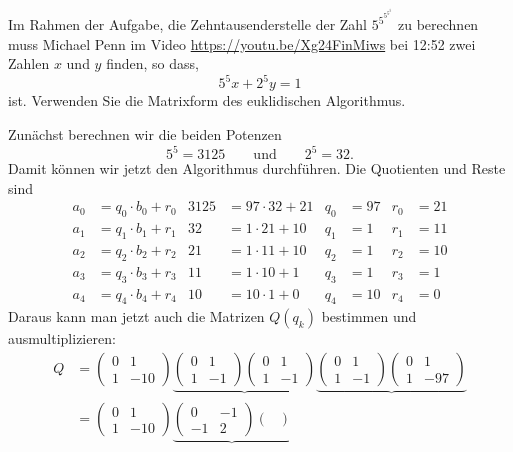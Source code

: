 Im Rahmen der Aufgabe, die Zehntausenderstelle der Zahl $5^{5^{5^{5^5}}}$
zu berechnen muss Michael Penn im Video 
\url{https://youtu.be/Xg24FinMiws} bei 12:52 zwei Zahlen $x$ und $y$ finden,
so dass,
\[
5^5x
+
2^5y
=
1
\]
ist.
Verwenden Sie die Matrixform des euklidischen Algorithmus.

\begin{loesung}
Zunächst berechnen wir die beiden Potenzen
\[
5^5 = 3125
\qquad\text{und}\qquad
2^5 = 32.
\]
Damit können wir jetzt den Algorithmus durchführen.
Die Quotienten und Reste sind
\begin{align*}
a_0&=q_0\cdot b_0 + r_0&
3125 &= 97 \cdot 32 + 21& q_0&=97 & r_0&= 21\\
a_1&=q_1\cdot b_1 + r_1&
32 &= 1\cdot 21 + 10    & q_1&= 1 & r_1&= 11\\
a_2&=q_2\cdot b_2 + r_2&
21 &= 1\cdot 11 + 10    & q_2&= 1 & r_2&= 10\\
a_3&=q_3\cdot b_3 + r_3&
11 &= 1\cdot 10 +  1    & q_3&= 1 & r_3&=  1\\
a_4&=q_4\cdot b_4 + r_4&
10 &= 10\cdot 1 +  0    & q_4&=10 & r_4&=  0
\end{align*}
Daraus kann man jetzt auch die Matrizen $Q(q_k)$ bestimmen und
ausmultiplizieren:
\begin{align*}
Q
&=
\begin{pmatrix}
0&1\\1&-10
\end{pmatrix}
\underbrace{
\begin{pmatrix}
0&1\\1&-1
\end{pmatrix}
\begin{pmatrix}
0&1\\1&-1
\end{pmatrix}
}_{}
\underbrace{
\begin{pmatrix}
0&1\\1&-1
\end{pmatrix}
\begin{pmatrix}
0&1\\1&-97
\end{pmatrix}
}_{}
\\
&=
\begin{pmatrix}
0&1\\1&-10
\end{pmatrix}
\underbrace{
\begin{pmatrix}
0&-1\\-1&2
\end{pmatrix}
\begin{pmatrix}

\end{pmatrix}}
\end{align*}
\end{loesung}
